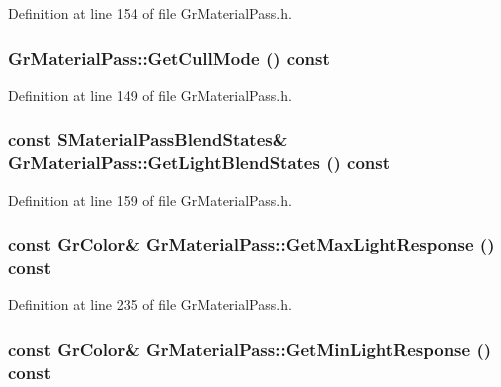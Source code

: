 Definition at line 154 of file GrMaterialPass.h.\hypertarget{class_gr_material_pass_365c60391a1ecf5468034f27db810c87}{
\subsubsection[{GetCullMode}]{ GrMaterialPass::GetCullMode () const}}
\label{class_gr_material_pass_365c60391a1ecf5468034f27db810c87}




Definition at line 149 of file GrMaterialPass.h.\hypertarget{class_gr_material_pass_cdf7d0d1244d270f8c68e7b8cf20bb14}{
\subsubsection[{GetLightBlendStates}]{\setlength{\rightskip}{0pt plus 5cm}const {\bf SMaterialPassBlendStates}\& GrMaterialPass::GetLightBlendStates () const}}
\label{class_gr_material_pass_cdf7d0d1244d270f8c68e7b8cf20bb14}




Definition at line 159 of file GrMaterialPass.h.\hypertarget{class_gr_material_pass_404104b92d23577c62da193eaeacc6cf}{
\subsubsection[{GetMaxLightResponse}]{\setlength{\rightskip}{0pt plus 5cm}const {\bf GrColor}\& GrMaterialPass::GetMaxLightResponse () const}}
\label{class_gr_material_pass_404104b92d23577c62da193eaeacc6cf}




Definition at line 235 of file GrMaterialPass.h.\hypertarget{class_gr_material_pass_9609353bb1089baeba6a0a176501cf9f}{
\subsubsection[{GetMinLightResponse}]{\setlength{\rightskip}{0pt plus 5cm}const {\bf GrColor}\& GrMaterialPass::GetMinLightResponse () const}}
\label{class_gr_material_pass_9609353bb1089baeba6a0a176501cf9f}




